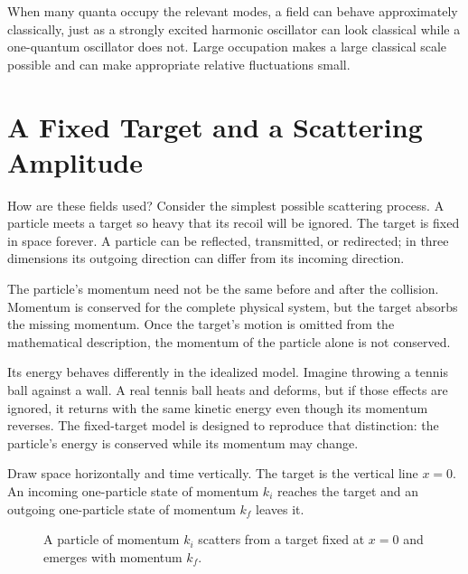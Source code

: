When many quanta occupy the relevant modes, a field can behave approximately classically, just as a strongly excited harmonic oscillator can look classical while a one-quantum oscillator does not. Large occupation makes a large classical scale possible and can make appropriate relative fluctuations small.


\section{A Fixed Target and a Scattering Amplitude}

How are these fields used? Consider the simplest possible scattering process. A particle meets a target so heavy that its recoil will be ignored. The target is fixed in space forever. A particle can be reflected, transmitted, or redirected; in three dimensions its outgoing direction can differ from its incoming direction.

The particle's momentum need not be the same before and after the collision. Momentum is conserved for the complete physical system, but the target absorbs the missing momentum. Once the target's motion is omitted from the mathematical description, the momentum of the particle alone is not conserved.

Its energy behaves differently in the idealized model. Imagine throwing a tennis ball against a wall. A real tennis ball heats and deforms, but if those effects are ignored, it returns with the same kinetic energy even though its momentum reverses. The fixed-target model is designed to reproduce that distinction: the particle's energy is conserved while its momentum may change.

Draw space horizontally and time vertically. The target is the vertical line \(x=0\). An incoming one-particle state of momentum \(k_i\) reaches the target and an outgoing one-particle state of momentum \(k_f\) leaves it.

\begin{figure}[h]
\centering
{}
\caption{A particle of momentum \(k_i\) scatters from a target fixed at \(x=0\) and emerges with momentum \(k_f\).}
\end{figure}

